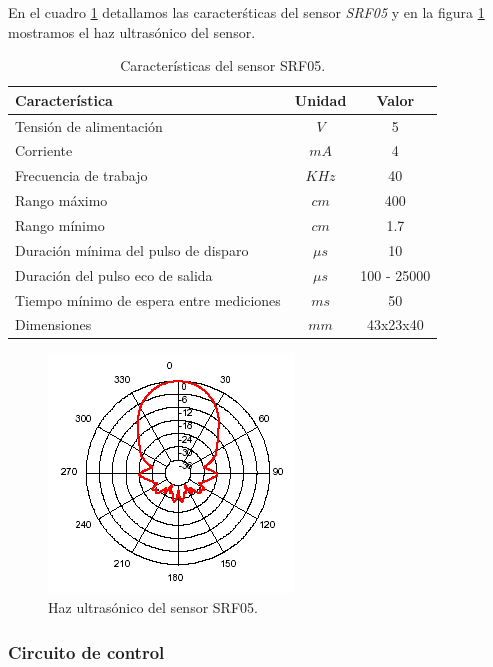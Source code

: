 En el cuadro \ref{hT_srf05} detallamos las caracter\'sticas del sensor \emph{SRF05} y en la figura \ref{hF_srf05} mostramos el haz ultras\'onico
del sensor.

\begin{table}[ht]
	\begin{center}
		\begin{tabular}{|l|c|c|}
			\hline
			Caracter\'istica & Unidad & Valor\\
			\hline
			Tensi\'on de alimentaci\'on & $V$ & 5 \\
			Corriente & $mA$ & 4 \\
			Frecuencia de trabajo & $KHz$ & 40 \\
			Rango m\'aximo & $cm$ & 400 \\
			Rango m\'inimo & $cm$ & 1.7 \\
			Duraci\'on m\'inima del pulso de disparo & $\mu s$ & 10 \\
			Duraci\'on del pulso eco de salida & $\mu s$& 100 - 25000 \\
			Tiempo m\'inimo de espera entre mediciones & $m s$ & 50 \\
			Dimensiones & $mm$ & 43x23x40 \\
			\hline
		\end{tabular}
	\end{center}
	\caption{Caracter\'isticas del sensor SRF05.}
	\label{hT_srf05}
\end{table}

\begin{figure}[ht]
	\centering
	\includegraphics[scale=0.5]{srf05_beam.png}
	\caption{Haz ultras\'onico del sensor SRF05.}
	\label{hF_srf05}
\end{figure}

\subsubsection{Circuito de control}
\label{h_sensado_ultrasonido_circuito}

